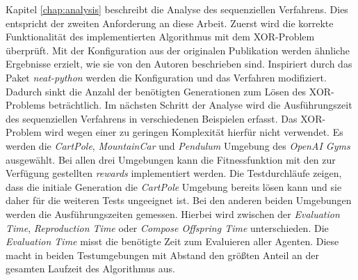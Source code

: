Kapitel \ref{chap:analysis} beschreibt die Analyse des sequenziellen Verfahrens. Dies entspricht der zweiten Anforderung an diese Arbeit. Zuerst wird die korrekte Funktionalität des implementierten Algorithmus mit dem XOR-Problem überprüft. Mit der Konfiguration aus der originalen Publikation werden ähnliche Ergebnisse erzielt, wie sie von den Autoren beschrieben sind. Inspiriert durch das Paket \emph{neat-python} werden die Konfiguration und das Verfahren modifiziert. Dadurch sinkt die Anzahl der benötigten Generationen zum Lösen des XOR-Problems beträchtlich. Im nächsten Schritt der Analyse wird die Ausführungszeit des sequenziellen Verfahrens in verschiedenen Beispielen erfasst. Das XOR-Problem wird wegen einer zu geringen Komplexität hierfür nicht verwendet. Es werden die \emph{CartPole}, \emph{MountainCar} und \emph{Pendulum} Umgebung des \emph{OpenAI Gyms} ausgewählt. Bei allen drei Umgebungen kann die Fitnessfunktion mit den zur Verfügung gestellten \emph{rewards} implementiert werden. Die Testdurchläufe zeigen, dass die initiale Generation die \emph{CartPole} Umgebung bereits lösen kann und sie daher für die weiteren Tests ungeeignet ist. Bei den anderen beiden Umgebungen werden die Ausführungszeiten gemessen. Hierbei wird zwischen der \emph{Evaluation Time}, \emph{Reproduction Time} oder \emph{Compose Offspring Time} unterschieden. Die \emph{Evaluation Time} misst die benötigte Zeit zum Evaluieren aller Agenten. Diese macht in beiden Testumgebungen mit Abstand den größten Anteil an der gesamten Laufzeit des Algorithmus aus.
\\\\
